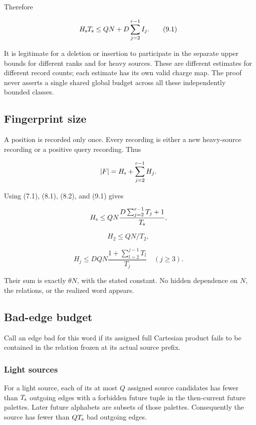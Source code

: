 Therefore

\[
H_{\rm s}T_{\rm s}\le QN+D\sum_{j=2}^{r-1}I_j. \tag{9.1}
\]

It is legitimate for a deletion or insertion to participate in the separate upper bounds for different ranks and for heavy sources. These are different estimates for different record counts; each estimate has its own valid charge map. The proof never asserts a single shared global budget across all these independently bounded classes.

\subsection{Fingerprint size}\label{fingerprint-size}

A position is recorded only once. Every recording is either a new heavy-source recording or a positive query recording. Thus

\[
|F|=H_{\rm s}+\sum_{j=2}^{r-1}H_j.
\]

Using (7.1), (8.1), (8.2), and (9.1) gives

\[
H_{\rm s}\le QN\frac{D\sum_{j=2}^{r-1}T_j+1}{T_{\rm s}},
\]

\[
H_2\le QN/T_2,
\]

\[
H_j\le DQN\frac{1+\sum_{l=2}^{j-1}T_l}{T_j}
\quad (j\ge3).
\]

Their sum is exactly \(\theta N\), with the stated constant. No hidden dependence on \(N\), the relations, or the realized word appears.

\subsection{Bad-edge budget}\label{bad-edge-budget}

Call an edge bad for this word if its assigned full Cartesian product fails to be contained in the relation frozen at its actual source prefix.

\subsubsection{Light sources}\label{light-sources}

For a light source, each of its at most \(Q\) assigned source candidates has fewer than \(T_{\rm s}\) outgoing edges with a forbidden future tuple in the then-current future palettes. Later future alphabets are subsets of those palettes. Consequently the source has fewer than \(QT_{\rm s}\) bad outgoing edges.

